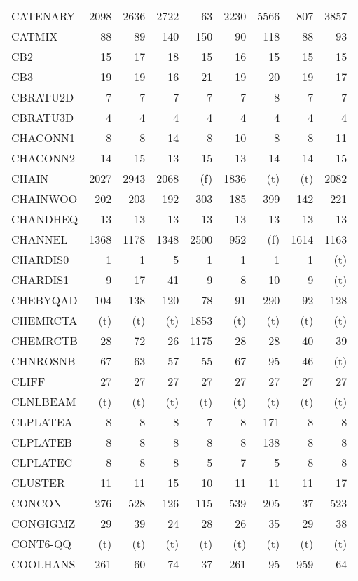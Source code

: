 \documentclass[11pt,twoside]{article}
\begin{document}
{\begin{longtable}[c]{|l|r|r|r|r|r|r|r|r|}
 CATENARY & 2098 & 2636 & 2722 & 63 & 2230 & 5566 & 807 & 3857 \\
 CATMIX & 88 & 89 & 140 & 150 & 90 & 118 & 88 & 93 \\
 CB2 & 15 & 17 & 18 & 15 & 16 & 15 & 15 & 15 \\
 CB3 & 19 & 19 & 16 & 21 & 19 & 20 & 19 & 17 \\
 CBRATU2D & 7 & 7 & 7 & 7 & 7 & 8 & 7 & 7 \\
 CBRATU3D & 4 & 4 & 4 & 4 & 4 & 4 & 4 & 4 \\
 CHACONN1 & 8 & 8 & 14 & 8 & 10 & 8 & 8 & 11 \\
 CHACONN2 & 14 & 15 & 13 & 15 & 13 & 14 & 14 & 15 \\
 CHAIN & 2027 & 2943 & 2068 & (f) & 1836 & (t) & (t) & 2082 \\
 CHAINWOO & 202 & 203 & 192 & 303 & 185 & 399 & 142 & 221 \\
 CHANDHEQ & 13 & 13 & 13 & 13 & 13 & 13 & 13 & 13 \\
 CHANNEL & 1368 & 1178 & 1348 & 2500 & 952 & (f) & 1614 & 1163 \\
 CHARDIS0 & 1 & 1 & 5 & 1 & 1 & 1 & 1 & (t) \\
 CHARDIS1 & 9 & 17 & 41 & 9 & 8 & 10 & 9 & (t) \\
 CHEBYQAD & 104 & 138 & 120 & 78 & 91 & 290 & 92 & 128 \\
 CHEMRCTA & (t) & (t) & (t) & 1853 & (t) & (t) & (t) & (t) \\
 CHEMRCTB & 28 & 72 & 26 & 1175 & 28 & 28 & 40 & 39 \\
 CHNROSNB & 67 & 63 & 57 & 55 & 67 & 95 & 46 & (t) \\
 CLIFF & 27 & 27 & 27 & 27 & 27 & 27 & 27 & 27 \\
 CLNLBEAM & (t) & (t) & (t) & (t) & (t) & (t) & (t) & (t) \\
 CLPLATEA & 8 & 8 & 8 & 7 & 8 & 171 & 8 & 8 \\
 CLPLATEB & 8 & 8 & 8 & 8 & 8 & 138 & 8 & 8 \\
 CLPLATEC & 8 & 8 & 8 & 5 & 7 & 5 & 8 & 8 \\
 CLUSTER & 11 & 11 & 15 & 10 & 11 & 11 & 11 & 17 \\
 CONCON & 276 & 528 & 126 & 115 & 539 & 205 & 37 & 523 \\
 CONGIGMZ & 29 & 39 & 24 & 28 & 26 & 35 & 29 & 38 \\
 CONT6-QQ & (t) & (t) & (t) & (t) & (t) & (t) & (t) & (t) \\
 COOLHANS & 261 & 60 & 74 & 37 & 261 & 95 & 959 & 64 \\

\end{longtable}}
\end{document}
